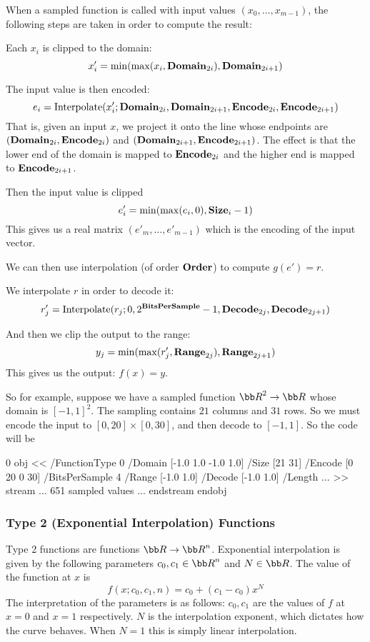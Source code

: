 When a sampled function is called with input values $(x_0,\dots,x_{m-1})$, the following steps are taken in
order to compute the result:
\benum
    \item Each $x_i$ is clipped to the domain:
        $$ x'_i = \min(\max(x_i,{\bf Domain}_{2i}),{\bf Domain}_{2i+1}) $$
    \item The input value is then encoded:
        $$ e_i = \mathop{\rm Interpolate}(x'_i;{\bf Domain}_{2i},{\bf Domain}_{2i+1},{\bf Encode}_{2i},{\bf Encode}_{2i+1}) $$
        That is, given an input $x$, we project it onto the line whose endpoints are
        $({\bf Domain}_{2i},{\bf Encode}_{2i})$ and $({\bf Domain}_{2i+1},{\bf Encode}_{2i+1})$.
        The effect is that the lower end of the domain is mapped to ${\bf Encode}_{2i}$ and the higher end
        is mapped to ${\bf Encode}_{2i+1}$.
    \item Then the input value is clipped
        $$ e'_i = \min(\max(e_i,0),{\bf Size}_i-1) $$
        This gives us a real matrix $(e'_m,\dots,e'_{m-1})$ which is the encoding of the input vector.
    \item We can then use interpolation (of order ${\bf Order}$) to compute $g(e')=r$.
    \item We interpolate $r$ in order to decode it:
        $$ r'_j = \mathop{\rm Interpolate}(r_j;0,2^{\bf BitsPerSample}-1,{\bf Decode}_{2j},{\bf Decode}_{2j+1}) $$
    \item And then we clip the output to the range:
        $$ y_j = \min(\max(r'_j,{\bf Range}_{2j}),{\bf Range}_{2j+1}) $$
        This gives us the output: $f(x)=y$.
\eenum

So for example, suppose we have a sampled function ${\bb R}^2\to{\bb R}$ whose domain is $[-1,1]^2$.
The sampling contains $21$ columns and $31$ rows.
So we must encode the input to $[0,20]\times[0,30]$, and then decode to $[-1,1]$.
So the code will be

 0 obj
<<
    /FunctionType 0
    /Domain [-1.0 1.0 -1.0 1.0]
    /Size [21 31]
    /Encode [0 20 0 30]
    /BitsPerSample 4
    /Range [-1.0 1.0]
    /Decode [-1.0 1.0]
    /Length ...
>>
stream
... 651 sampled values ...
endstream
endobj
\elisting

\subsubsection{Type 2 (Exponential Interpolation) Functions}

Type 2 functions are functions ${\bb R}\to{\bb R}^n$.
Exponential interpolation is given by the following parameters $c_0,c_1\in{\bb R}^n$ and $N\in{\bb R}$.
The value of the function at $x$ is
$$ f(x;c_0,c_1,n) = c_0 + (c_1-c_0)x^N $$
The interpretation of the parameters is as follows: $c_0,c_1$ are the values of $f$ at $x=0$ and $x=1$
respectively.
$N$ is the interpolation exponent, which dictates how the curve behaves.
When $N=1$ this is simply linear interpolation.

